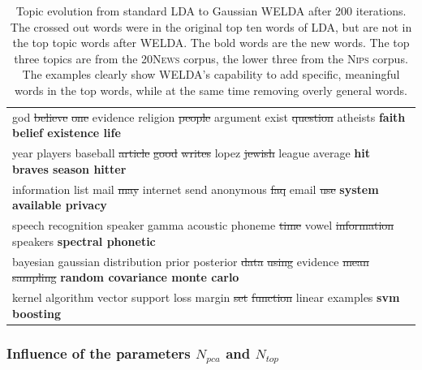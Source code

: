 \documentclass[
        a4paper,
        titlepage,
        twoside,
        parskip,
        numbers=noenddot
        ]{scrbook}
\newcommand{\ra}[1]{\renewcommand{\arraystretch}{#1}}
\theoremstyle{break}
\begin{document}
\begin{table}[]
  \ra{1.15}
  \centering
  \caption{Topic evolution from standard LDA to Gaussian WELDA after 200 iterations. The crossed out words were in the original top ten words of LDA, but are not in the top topic words after WELDA. The bold words are the new words. The top three topics are from the \textsc{20News} corpus, the lower three from the \textsc{Nips} corpus. The examples clearly show WELDA's capability to add specific, meaningful words in the top words, while at the same time removing overly general words.}
  \label{table:topic_development}
  \begin{tabular}{p{13.5cm}}
    \toprule
    god \sout{believe} \sout{one} evidence religion \sout{people} argument exist \sout{question} atheists \textbf{faith belief existence life} \\
    year players baseball \sout{article} \sout{good} \sout{writes} lopez \sout{jewish} league average \textbf{hit braves season hitter} \\
    information list mail \sout{may} internet send anonymous \sout{faq} email \sout{use} \textbf{system available privacy} \\
    \midrule
    speech recognition speaker gamma acoustic phoneme \sout{time} vowel \sout{information} speakers \textbf{spectral phonetic} \\
    bayesian gaussian distribution prior posterior \sout{data} \sout{using} evidence \sout{mean} \sout{sampling} \textbf{random covariance monte carlo} \\
    kernel algorithm vector support loss margin \sout{set} \sout{function} linear examples \textbf{svm boosting} \\
    \bottomrule
  \end{tabular}
\end{table}

\subsubsection{Influence of the parameters $N_{pca}$ and $N_{top}$}
\end{document}

